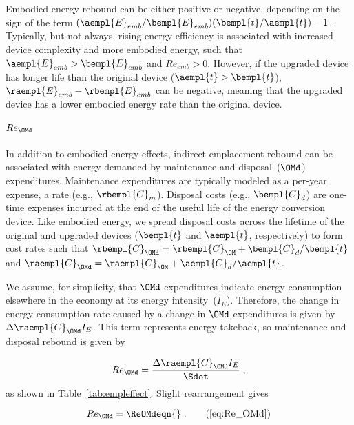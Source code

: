 Embodied energy rebound can be either positive or negative, depending on 
the sign of the term
$(\aempl{E}_{emb}/\bempl{E}_{emb})(\bempl{t}/\aempl{t}) - 1$.
Typically, but not always,
rising energy efficiency is associated with increased device complexity
and more embodied energy,
such that $\aempl{E}_{emb} > \bempl{E}_{emb}$ and $Re_{emb} > 0$.
However, if the upgraded device has longer life than the original device
($\aempl{t} > \bempl{t}$),
$\raempl{E}_{emb} - \rbempl{E}_{emb}$ can be negative,
meaning that the upgraded device has a lower embodied energy rate than the original device.


\paragraph{$Re_{\OMd}$} 
\label{sec:Re_OMd}

In addition to embodied energy effects, 
indirect emplacement rebound 
can be associated with energy demanded by maintenance and disposal~($\OMd$) expenditures.
Maintenance expenditures are typically modeled as a per-year expense, 
a rate (e.g., $\rbempl{C}_m$).
Disposal costs (e.g., $\bempl{C}_d$) are one-time expenses incurred at the end of the useful life of the energy conversion device.
Like embodied energy, we spread disposal costs across the lifetime 
of the original and upgraded devices ($\bempl{t}$ and $\aempl{t}$, respectively)
to form cost rates such that $\rbempl{C}_{\OMd} = \rbempl{C}_{\OM} + \bempl{C}_d/\bempl{t}$
and
$\raempl{C}_{\OMd} = \raempl{C}_{\OM} + \aempl{C}_d/\aempl{t}$.

We assume, for simplicity, that $\OMd$ expenditures indicate energy consumption
elsewhere in the economy at its energy intensity~($I_E$).
Therefore, the change in energy consumption rate caused by a change in $\OMd$ expenditures
is given by $\Delta \raempl{C}_{\OMd} I_E$.
This term represents energy takeback, so maintenance and disposal rebound is given by

\begin{equation} \label{eq:Re_OMd_def}
  Re_{\OMd} = \frac{\Delta \raempl{C}_{\OMd} I_E}{\Sdot} \; ,
\end{equation}
%
as shown in Table~\ref{tab:empleffect}.
Slight rearrangement gives

\begin{equation}
  Re_{\OMd} = \ReOMdeqn{} \; . \tag{\ref{eq:Re_OMd}}
\end{equation}

